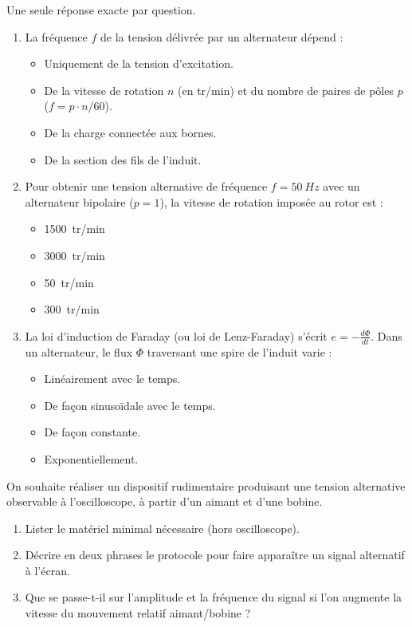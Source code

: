 \documentclass[11pt]{article}
\begin{document}
\begin{exercice}
Une seule réponse exacte par question.
\begin{enumerate}
    \item La fréquence $f$ de la tension délivrée par un alternateur dépend :
    \begin{itemize}
        \item[$\square$] Uniquement de la tension d'excitation.
        \item[$\square$] De la vitesse de rotation $n$ (en tr/min) et du nombre de paires de pôles $p$ ($f = p \cdot n/60$).
        \item[$\square$] De la charge connectée aux bornes.
        \item[$\square$] De la section des fils de l'induit.
    \end{itemize}
    \item Pour obtenir une tension alternative de fréquence $f = \SI{50}{Hz}$ avec un alternateur bipolaire ($p=1$), la vitesse de rotation imposée au rotor est :
    \begin{itemize}
        \item[$\square$] \SI{1500}{tr/min}
        \item[$\square$] \SI{3000}{tr/min}
        \item[$\square$] \SI{50}{tr/min}
        \item[$\square$] \SI{300}{tr/min}
    \end{itemize}
    \item La loi d'induction de Faraday (ou loi de Lenz-Faraday) s'écrit $e = - \frac{d\Phi}{dt}$. Dans un alternateur, le flux $\Phi$ traversant une spire de l'induit varie :
    \begin{itemize}
        \item[$\square$] Linéairement avec le temps.
        \item[$\square$] De façon sinusoïdale avec le temps.
        \item[$\square$] De façon constante.
        \item[$\square$] Exponentiellement.
    \end{itemize}
\end{enumerate}
\end{exercice}

\begin{exercice}
On souhaite réaliser un dispositif rudimentaire produisant une tension alternative observable à l'oscilloscope, à partir d'un aimant et d'une bobine.
\begin{enumerate}
    \item Lister le matériel minimal nécessaire (hors oscilloscope).
    \item Décrire en deux phrases le protocole pour faire apparaître un signal alternatif à l'écran.
    \item Que se passe-t-il sur l'amplitude et la fréquence du signal si l'on augmente la vitesse du mouvement relatif aimant/bobine ?
\end{enumerate}
\end{exercice}
\end{document}
